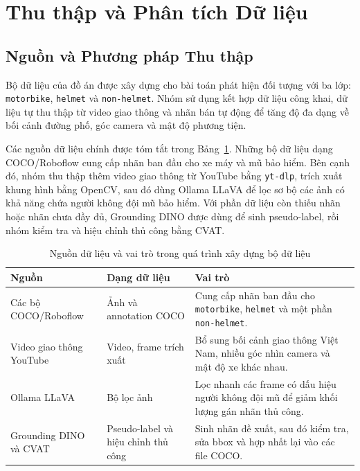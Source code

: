 \section{Thu thập và Phân tích Dữ liệu}
\label{sec:data}

\subsection{Nguồn và Phương pháp Thu thập}

Bộ dữ liệu của đồ án được xây dựng cho bài toán phát hiện đối tượng với ba lớp: \texttt{motorbike}, \texttt{helmet} và \texttt{non-helmet}. Nhóm sử dụng kết hợp dữ liệu công khai, dữ liệu tự thu thập từ video giao thông và nhãn bán tự động để tăng độ đa dạng về bối cảnh đường phố, góc camera và mật độ phương tiện.

Các nguồn dữ liệu chính được tóm tắt trong Bảng~\ref{tab:data-sources}. Những bộ dữ liệu dạng COCO/Roboflow cung cấp nhãn ban đầu cho xe máy và mũ bảo hiểm. Bên cạnh đó, nhóm thu thập thêm video giao thông từ YouTube bằng \texttt{yt-dlp}, trích xuất khung hình bằng OpenCV, sau đó dùng Ollama LLaVA để lọc sơ bộ các ảnh có khả năng chứa người không đội mũ bảo hiểm. Với phần dữ liệu còn thiếu nhãn hoặc nhãn chưa đầy đủ, Grounding DINO được dùng để sinh pseudo-label, rồi nhóm kiểm tra và hiệu chỉnh thủ công bằng CVAT.

\begin{table}[H]
    \centering
    \small
    \caption{Nguồn dữ liệu và vai trò trong quá trình xây dựng bộ dữ liệu}
    \label{tab:data-sources}
    \begin{tabularx}{\textwidth}{l l X}
        \toprule
        \textbf{Nguồn} & \textbf{Dạng dữ liệu} & \textbf{Vai trò} \\
        \midrule
        Các bộ COCO/Roboflow & Ảnh và annotation COCO & Cung cấp nhãn ban đầu cho \texttt{motorbike}, \texttt{helmet} và một phần \texttt{non-helmet}. \\
        Video giao thông YouTube & Video, frame trích xuất & Bổ sung bối cảnh giao thông Việt Nam, nhiều góc nhìn camera và mật độ xe khác nhau. \\
        Ollama LLaVA & Bộ lọc ảnh & Lọc nhanh các frame có dấu hiệu người không đội mũ để giảm khối lượng gán nhãn thủ công. \\
        Grounding DINO và CVAT & Pseudo-label và hiệu chỉnh thủ công & Sinh nhãn đề xuất, sau đó kiểm tra, sửa bbox và hợp nhất lại vào các file COCO. \\
        \bottomrule
    \end{tabularx}
\end{table}

